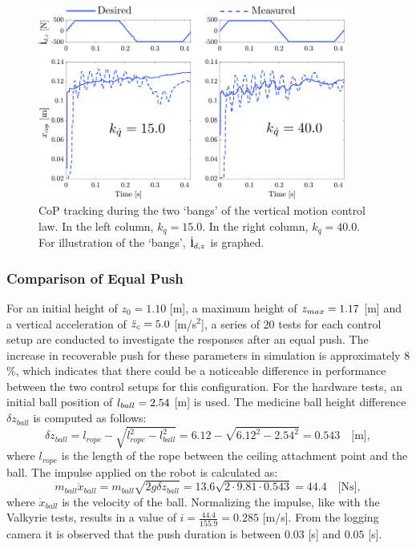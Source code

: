 \begin{figure}
\centering
\includegraphics[width=0.9\textwidth]{STYLESTUFF/atlascop.png}
\caption{\ac{CoP} tracking during the two `bangs' of the vertical motion control law. In the left column, $k_{\dot{q}}=15.0$. In the right column, $k_{\dot{q}}=40.0$. For illustration of the `bangs', $\dot{\mathbf{l}}_{d,z}$ is graphed. }
\label{fig:atlascop}
\end{figure}

\subsubsection{Comparison of Equal Push}
For an initial height of $z_0=1.10$ [m], a maximum height of $z_{max}=1.17$ [m] and a vertical acceleration of $\ddot{z}_{c}=5.0$ [m/s$^2$], a series of $20$ tests for each control setup are conducted to investigate the responses after an equal push. The increase in recoverable push for these parameters in simulation is approximately $8$\%, which indicates that there could be a noticeable difference in performance between the two control setups for this configuration. For the hardware tests, an initial ball position of $l_{ball}=2.54$ [m] is used. The medicine ball height difference $\delta z_{ball}$ is computed as follows:
\begin{equation}
	\delta z_{ball} = l_{rope} - \sqrt{l_{rope}^2-l_{ball}^2} = 6.12-\sqrt{6.12^2 - 2.54^2} = 0.543 \quad \text{[m]},
\end{equation}
where $l_{rope}$ is the length of the rope between the ceiling attachment point and the ball. The impulse applied on the robot is calculated as:
\begin{equation}
m_{ball}\dot{x}_{ball} = m_{ball}\sqrt{2g\delta z_{ball} } = 13.6\sqrt{2 \cdot 9.81 \cdot 0.543} = 44.4 \quad \text{[Ns]},
\end{equation}
where $\dot{x}_{ball}$ is the velocity of the ball. Normalizing the impulse, like with the Valkyrie tests, results in a value of $i=\frac{44.4}{155.9}=0.285$ [m/s]. From the logging camera it is observed that the push duration is between $0.03$ [s] and $0.05$ [s].

